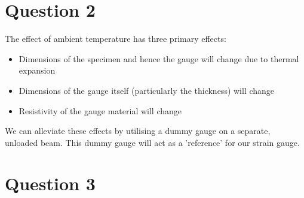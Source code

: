 \documentclass[12pt]{article}
\numberwithin{equation}{section}
\begin{document}
\section{Question 2}
The effect of ambient temperature has three primary effects:
\begin{itemize}
  \item Dimensions of the specimen and hence the gauge will change due to thermal expansion
  \item Dimensions of the gauge itself (particularly the thickness) will change
  \item Resistivity of the gauge material will change
\end{itemize}
We can alleviate these effects by utilising a dummy gauge on a separate, unloaded beam. This dummy gauge will act as a 'reference' for our strain gauge.
\section{Question 3}
\end{document}
